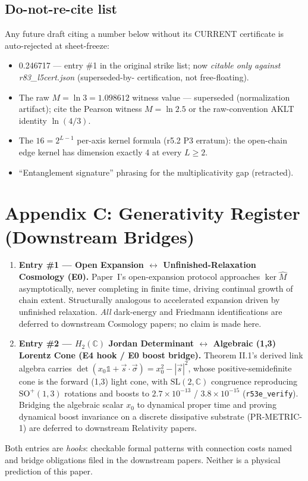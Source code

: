 \documentclass[11pt,a4paper]{article}
\theoremstyle{definition}
\begin{document}
\subsection*{Do-not-re-cite list}
Any future draft citing a number below without its CURRENT
certificate is auto-rejected at sheet-freeze:
\begin{itemize}[leftmargin=1.4em]
\item 0.246717 --- entry \#1 in the original strike list; now
\emph{citable only against r83\_l5cert.json} (superseded-by-
certification, not free-floating).
\item The raw $M = \ln 3 = 1.098612$ witness value ---
superseded (normalization artifact); cite the Pearson witness
$M = \ln 2.5$ or the raw-convention AKLT identity $\ln(4/3)$.
\item The $16 = 2^{L-1}$ per-axis kernel formula (r5.2 P3
erratum): the open-chain edge kernel has dimension exactly 4 at
every $L \geq 2$.
\item ``Entanglement signature'' phrasing for the
multiplicativity gap (retracted).
\end{itemize}

\section*{Appendix C: Generativity Register (Downstream Bridges)}

\begin{enumerate}[leftmargin=1.6em]
\item \textbf{Entry \#1 --- Open Expansion $\leftrightarrow$
Unfinished-Relaxation Cosmology (E0).} Paper~I's open-expansion
protocol approaches $\ker\hat M$ asymptotically, never completing
in finite time, driving continual growth of chain extent.
Structurally analogous to accelerated expansion driven by
unfinished relaxation. \emph{All} dark-energy and Friedmann
identifications are deferred to downstream Cosmology papers; no
claim is made here.
\item \textbf{Entry \#2 --- $H_2(\mathbb C)$ Jordan Determinant
$\leftrightarrow$ Algebraic (1,3) Lorentz Cone (E4 hook / E0
boost bridge).} Theorem II.1's derived link algebra carries
$\det(x_0\mathbb 1 + \vec s \cdot \vec\sigma) = x_0^2 -
|\vec s|^2$, whose positive-semidefinite cone is the forward
(1,3) light cone, with $\mathrm{SL}(2,\mathbb C)$ congruence
reproducing $\mathrm{SO}^+(1,3)$ rotations and boosts to
$2.7\times10^{-13}$ / $3.8\times10^{-15}$
(\texttt{r53e\_verify}). Bridging the algebraic scalar $x_0$ to
dynamical proper time and proving dynamical boost invariance on a
discrete dissipative substrate (PR-METRIC-1) are deferred to
downstream Relativity papers.
\end{enumerate}

\noindent Both entries are \emph{hooks}: checkable formal
patterns with connection costs named and bridge obligations filed
in the downstream papers. Neither is a physical prediction of
this paper.
\end{document}
